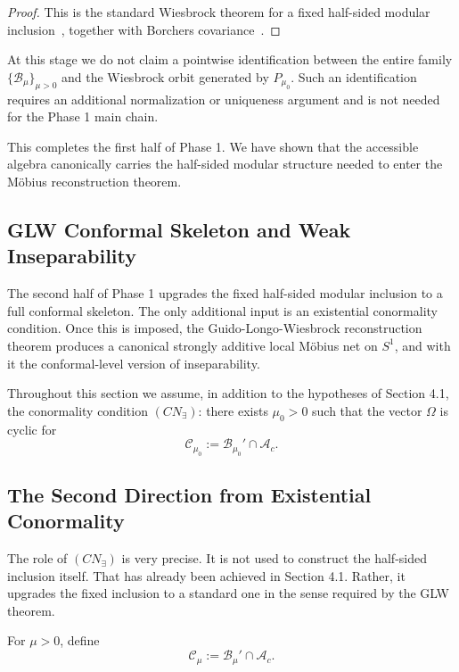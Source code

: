 \documentclass[12pt]{article}
\theoremstyle{definition}
\theoremstyle{remark}
\begin{document}
\begin{proof}
This is the standard Wiesbrock theorem for a fixed half-sided modular
inclusion~\cite{Wiesbrock1993}, together with Borchers covariance~\cite{Borchers1992}.
\end{proof}

At this stage we do not claim a pointwise identification between the
entire family \(\{\mathcal{B}_\mu\}_{\mu>0}\) and the Wiesbrock orbit
generated by \(P_{\mu_0}\). Such an identification requires an
additional normalization or uniqueness argument and is not needed for
the Phase 1 main chain.

This completes the first half of Phase 1. We have shown that the
accessible algebra canonically carries the half-sided modular structure
needed to enter the Möbius reconstruction theorem.

\subsection{GLW Conformal Skeleton and Weak
Inseparability}\label{glw-conformal-skeleton-and-weak-inseparability}

The second half of Phase 1 upgrades the fixed half-sided modular
inclusion to a full conformal skeleton. The only additional input is an
existential conormality condition. Once this is imposed, the
Guido-Longo-Wiesbrock reconstruction theorem produces a canonical
strongly additive local Möbius net on \(S^1\), and with it the
conformal-level version of inseparability.

Throughout this section we assume, in addition to the hypotheses of
Section 4.1, the conormality condition \((CN_\exists)\): there exists
\(\mu_0>0\) such that the vector \(\Omega\) is cyclic for \[
\mathcal{C}_{\mu_0}:=\mathcal{B}_{\mu_0}'\cap \mathcal{A}_c.
\]

\subsection{The Second Direction from Existential
Conormality}\label{the-second-direction-from-existential-conormality}

The role of \((CN_\exists)\) is very precise. It is not used to
construct the half-sided inclusion itself. That has already been
achieved in Section 4.1. Rather, it upgrades the fixed inclusion to a
standard one in the sense required by the GLW theorem.

For \(\mu>0\), define \[
\mathcal{C}_\mu:=\mathcal{B}_\mu'\cap \mathcal{A}_c.
\]
\end{document}
